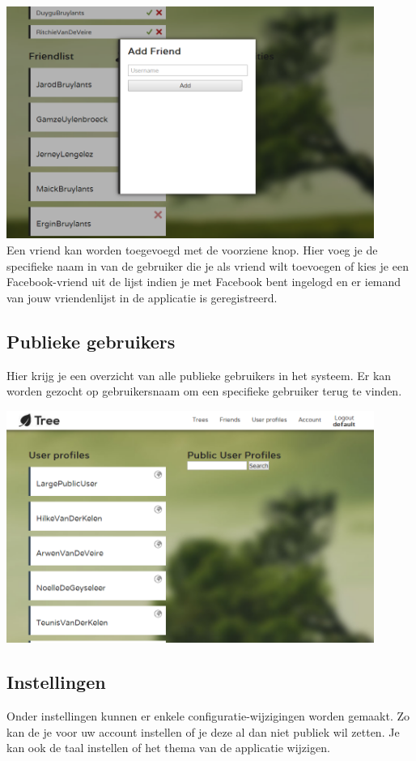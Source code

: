 \documentclass[pdftex,a4paper,12pt,twoside]{report}
\begin{document}
\includegraphics[width=12cm]{images/web_addfriend.png}\\[.5cm]
Een vriend kan worden toegevoegd met de voorziene knop. Hier voeg je de specifieke naam in van de gebruiker die je als vriend wilt toevoegen of kies je een Facebook-vriend uit de lijst indien je met Facebook bent ingelogd en er iemand van jouw vriendenlijst in de applicatie is geregistreerd.

\subsection{Publieke gebruikers}
Hier krijg je een overzicht van alle publieke gebruikers in het systeem. Er kan worden gezocht op gebruikersnaam om een specifieke gebruiker terug te vinden.

\includegraphics[width=12cm]{images/web_publicuser.png}\\[.5cm]

\subsection{Instellingen}
Onder instellingen kunnen er enkele configuratie-wijzigingen worden gemaakt. Zo kan de je voor uw account instellen of je deze al dan niet publiek wil zetten. Je kan ook de taal instellen of het thema van de applicatie wijzigen.
\end{document}
